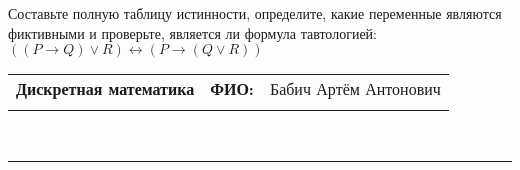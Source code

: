 \documentclass[10pt]{exam}
\newcommand{\class}{Дискретная математика}
\newcommand{\examdate}{}
\begin{document}
\begin{questions}
\begin{enumerate} [a)]
\end{enumerate}\question Составьте полную таблицу истинности, определите, какие переменные являются фиктивными и проверьте, является ли формула тавтологией:
$((P \rightarrow Q) \lor R) \leftrightarrow (P \rightarrow (Q \lor R))$

\end{questions}
\newpage
\begin{flushright}
\begin{tabular}{p{2.8in} r l}
\textbf{\class} & \textbf{ФИО:} &Бабич Артём Антонович
\\

\textbf{\examdate} &&\\
\end{tabular}\\
\end{flushright}
\rule[1ex]{\textwidth}{.1pt}
\end{document}
